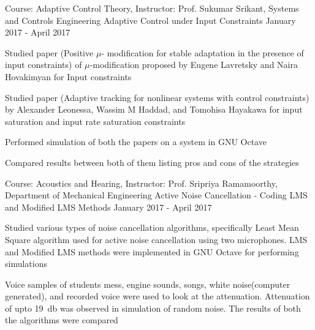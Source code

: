
\begin{cventries}

	\cventry
		{Course: Adaptive Control Theory, Instructor: Prof. Sukumar Srikant, Systems and Controls Engineering}
		{Adaptive Control under Input Constraints}
		{}
		{January 2017 - April 2017}
		{
		\begin{cvitems}
			\item Studied paper (Positive $\mu$- modification for stable adaptation in the presence of input constraints) of $\mu$-modification proposed by Eugene Lavretsky and Naira Hovakimyan for Input constraints
			\item Studied paper (Adaptive tracking for nonlinear systems with control constraints) by Alexander Leonessa, Wassim M Haddad, and Tomohisa Hayakawa for input saturation and input rate saturation constraints
			\item Performed simulation of both the papers on a system in GNU Octave
			\item Compared results between both of them listing pros and cons of the strategies 
		\end{cvitems}
		}

	\cventry
		{Course: Acoustics and Hearing, Instructor: Prof. Sripriya Ramamoorthy, Department of Mechanical Engineering}
		{Active Noise Cancellation - Coding LMS and Modified LMS Methods}
		{}
		{January 2017 - April 2017}
		{
		\begin{cvitems}
			\item Studied various types of noise cancellation algorithms, specifically Least Mean Square algorithm used for active noise cancellation using two microphones. LMS and Modified LMS methods were implemented in GNU Octave for performing simulations
			\item Voice samples of students mess, engine sounds, songs, white noise(computer generated), and recorded voice were used to look at the attenuation. Attenuation of upto \SI{19}{\decibel} was observed in simulation of random noise. The results of both the algorithms were compared
		\end{cvitems}
		}


\end{cventries}

